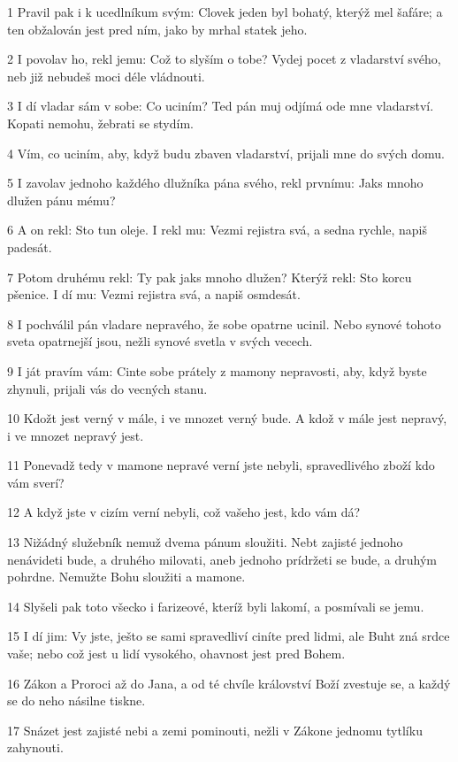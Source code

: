 \par 1 Pravil pak i k ucedlníkum svým: Clovek jeden byl bohatý, kterýž mel šafáre; a ten obžalován jest pred ním, jako by mrhal statek jeho.
\par 2 I povolav ho, rekl jemu: Což to slyším o tobe? Vydej pocet z vladarství svého, neb již nebudeš moci déle vládnouti.
\par 3 I dí vladar sám v sobe: Co uciním? Ted pán muj odjímá ode mne vladarství. Kopati nemohu, žebrati se stydím.
\par 4 Vím, co uciním, aby, když budu zbaven vladarství, prijali mne do svých domu.
\par 5 I zavolav jednoho každého dlužníka pána svého, rekl prvnímu: Jaks mnoho dlužen pánu mému?
\par 6 A on rekl: Sto tun oleje. I rekl mu: Vezmi rejistra svá, a sedna rychle, napiš padesát.
\par 7 Potom druhému rekl: Ty pak jaks mnoho dlužen? Kterýž rekl: Sto korcu pšenice. I dí mu: Vezmi rejistra svá, a napiš osmdesát.
\par 8 I pochválil pán vladare nepravého, že sobe opatrne ucinil. Nebo synové tohoto sveta opatrnejší jsou, nežli synové svetla v svých vecech.
\par 9 I ját pravím vám: Cinte sobe prátely z mamony nepravosti, aby, když byste zhynuli, prijali vás do vecných stanu.
\par 10 Kdožt jest verný v mále, i ve mnozet verný bude. A kdož v mále jest nepravý, i ve mnozet nepravý jest.
\par 11 Ponevadž tedy v mamone nepravé verní jste nebyli, spravedlivého zboží kdo vám sverí?
\par 12 A když jste v cizím verní nebyli, což vašeho jest, kdo vám dá?
\par 13 Nižádný služebník nemuž dvema pánum sloužiti. Nebt zajisté jednoho nenávideti bude, a druhého milovati, aneb jednoho prídržeti se bude, a druhým pohrdne. Nemužte Bohu sloužiti a mamone.
\par 14 Slyšeli pak toto všecko i farizeové, kteríž byli lakomí, a posmívali se jemu.
\par 15 I dí jim: Vy jste, ješto se sami spravedliví ciníte pred lidmi, ale Buht zná srdce vaše; nebo což jest u lidí vysokého, ohavnost jest pred Bohem.
\par 16 Zákon a Proroci až do Jana, a od té chvíle království Boží zvestuje se, a každý se do neho násilne tiskne.
\par 17 Snázet jest zajisté nebi a zemi pominouti, nežli v Zákone jednomu tytlíku zahynouti.
